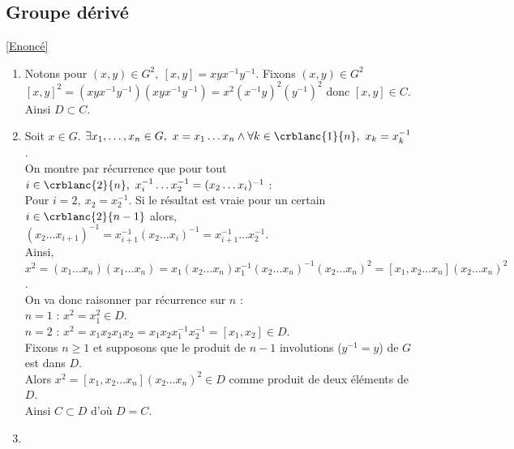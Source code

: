 \documentclass[8pt]{book}
\begin{document}
	\subsection{Groupe dérivé }
	\label{Groupe dérivé corrigé}
	\textcolor{blue}{\hyperref[Groupe dérivé]{[Enoncé]}}\\
	\begin{enumerate}[leftmargin=*]
		\item Notons pour $(x,y)\in G^2,\ [x,y]=xyx^{-1}y^{-1}$. Fixons $(x,y)\in G^2$\\
		$[x,y]^2=(xyx^{-1}y^{-1})(xyx^{-1}y^{-1})=x^2(x^{-1}y)^2(y^{-1})^2$ donc $[x,y]\in C$.\\
		Ainsi $D\subset C$.
		\item Soit $x\in G$. $\exists x_1,\dots,x_n\in G,\ x=x_1\dots x_n\land\forall k\in \crblanc{1}{n},\ x_k=x_k^{-1}$.\\
		On montre par récurrence que pour tout $i\in \crblanc{2}{n},\ x_i^{-1}\dots x_2^{-1}=(x_2\dots x_i)^{-1}$ :\\
		Pour $i=2,\ x_2=x_2^{-1}$. Si le résultat est vraie pour un certain $i\in \crblanc{2}{n-1}$ alors,\\
		$(x_2\dots x_{i+1})^{-1}=x_{i+1}^{-1}(x_2\dots x_i)^{-1}=x_{i+1}^{-1}\dots x_2^{-1}$.\\
		Ainsi, $x^2=(x_1\dots x_n)(x_1\dots x_n)=x_1(x_2\dots x_n)x_1^{-1}(x_2\dots x_n)^{-1}(x_2\dots x_n)^2=[x_1,x_2\dots x_n](x_2\dots x_n)^2$.\\
		On va donc raisonner par récurrence sur $n$ :\\
		$n=1$ : $x^2=x_1^2\in D$.\\
		$n=2$ : $x^2=x_1x_2x_1x_2=x_1x_2x_1^{-1}x_2^{-1}=[x_1,x_2]\in D$.\\
		Fixons $n\geq 1$ et supposons que le produit de $n-1$ involutions ($y^{-1}=y$) de $G$ est dans $D$.\\
		Alors $x^2=[x_1,x_2\dots x_n](x_2\dots x_n)^2\in D$ comme produit de deux éléments de $D$.\\
		Ainsi $C\subset D$ d'où $D=C$.
		\item
		\begin{enumerate}[label=\alph*.]
			\item Soit $M=\begin{pmatrix}\cos(\theta)&-\sin(\theta)\\\sin(\theta)&\cos(\theta)\end{pmatrix}\in \text{SO}_2(\R)$. Soient $A=\begin{pmatrix}\cos(\alpha)&\sin(\alpha)\\\sin(\alpha)&-\cos(\alpha)

\end{pmatrix}
\end{enumerate}
\end{enumerate}
\end{document}
